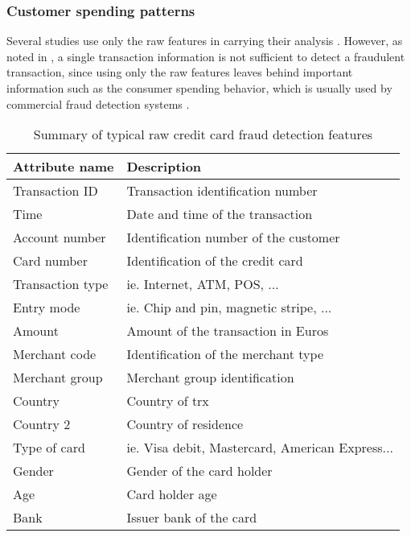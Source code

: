 \subsubsection{Customer spending patterns}
\label{sec:4:frad:features_agg}
  
  Several studies use only the raw features in carrying  their analysis 
  \citep{Brause1999a,Minegishi2011,Panigrahi2009,Sanchez2009}. However, as noted in 
  \citep{Bolton2001}, a single transaction information is not sufficient to detect a fraudulent 
  transaction, since using only the raw features leaves behind important information such as 
  the consumer spending behavior, which is usually used by commercial fraud detection systems  
  \citep{Whitrow2008}.
  
	\begin{table}[!t]
   \centering
   \footnotesize
   \begin{tabular}{l l}
   \hline
   \textbf{Attribute name} & \textbf{Description}\\
   \hline
		Transaction ID & Transaction identification number \\
   Time & Date and time of the transaction\\
   Account number & Identification number of the customer\\
   Card number & Identification of the credit card\\
   Transaction type & ie. Internet, ATM, POS, ...\\
	 Entry mode & ie. Chip and pin, magnetic stripe, ...\\
   Amount & Amount of the transaction in Euros\\
   Merchant code & Identification of the merchant type\\
   Merchant group & Merchant group identification\\
   Country & Country of trx\\
   Country 2 & Country of residence \\
   Type of card & ie. Visa debit, Mastercard, American Express...\\
   Gender & Gender of the card holder\\
   Age & Card holder age\\
   Bank & Issuer bank of the card\\
   \hline
   \end{tabular}
   \caption{Summary of typical raw credit card fraud detection features}
   \label{tab:4:raw_features}
   \end{table}
	
